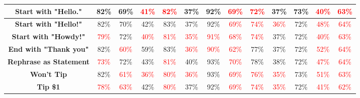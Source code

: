 \documentclass[11pt, dvipsnames]{article}
\begin{document}
\begin{table}
\begin{tabular}{|c|c|c|c|c|c|c|c|c|c|c|c||c|}
		\hline
		\textbf{\textcolor{Perturbations}{Start with "Hello."}} & \textcolor{happygreen}{82\%} & \textcolor{happygreen}{69\%} & \textcolor{red}{41\%} & \textcolor{red}{82\%} &     37\% &     92\% & \textcolor{red}{69\%} & \textcolor{red}{72\%} &     37\% & \textcolor{happygreen}{73\%} & \textcolor{red}{40\%} & \textcolor{red}{63\%}\\
		\hline
		\textbf{\textcolor{Perturbations}{Start with "Hello!"}} & \textcolor{happygreen}{82\%} & \textcolor{happygreen}{70\%} &     42\% &     83\% &     37\% &     92\% & \textcolor{red}{69\%} & \textcolor{red}{74\%} & \textcolor{red}{36\%} &     72\% & \textcolor{red}{48\%} & \textcolor{red}{64\%}\\
		\hline
		\textbf{\textcolor{Perturbations}{Start with "Howdy!"}} & \textcolor{red}{79\%} & \textcolor{happygreen}{72\%} & \textcolor{red}{40\%} & \textcolor{red}{81\%} & \textcolor{red}{35\%} & \textcolor{red}{91\%} & \textcolor{red}{68\%} & \textcolor{red}{74\%} &     37\% &     72\% & \textcolor{red}{40\%} & \textcolor{red}{63\%}\\
		\hline
		\textbf{\textcolor{Perturbations}{End with "Thank you"}} & \textcolor{happygreen}{82\%} & \textcolor{red}{60\%} & \textcolor{happygreen}{59\%} &     83\% & \textcolor{red}{36\%} & \textcolor{red}{90\%} & \textcolor{red}{62\%} &     77\% &     37\% &     72\% & \textcolor{red}{52\%} & \textcolor{red}{64\%}\\
		\hline
		\textbf{\textcolor{Perturbations}{Rephrase as Statement}} & \textcolor{red}{73\%} & \textcolor{happygreen}{72\%} & \textcolor{happygreen}{43\%} & \textcolor{red}{81\%} & \textcolor{happygreen}{40\%} & \textcolor{happygreen}{93\%} & \textcolor{red}{70\%} & \textcolor{happygreen}{78\%} & \textcolor{happygreen}{38\%} &     72\% & \textcolor{red}{47\%} & \textcolor{red}{64\%}\\
		\hline
		\textbf{\textcolor{Tipping}{Won't Tip}} & \textcolor{happygreen}{82\%} & \textcolor{red}{61\%} & \textcolor{red}{36\%} & \textcolor{red}{80\%} & \textcolor{red}{36\%} & \textcolor{happygreen}{93\%} & \textcolor{red}{69\%} & \textcolor{red}{76\%} & \textcolor{red}{35\%} & \textcolor{happygreen}{73\%} & \textcolor{red}{51\%} & \textcolor{red}{63\%}\\
		\hline
		\textbf{\textcolor{Tipping}{Tip \$1}} & \textcolor{red}{78\%} & \textcolor{red}{63\%} &     42\% & \textcolor{red}{80\%} &     37\% &     92\% & \textcolor{red}{69\%} & \textcolor{red}{74\%} & \textcolor{red}{35\%} &     72\% & \textcolor{red}{41\%} & \textcolor{red}{62\%}\\

\end{tabular}
\end{table}
\end{document}
